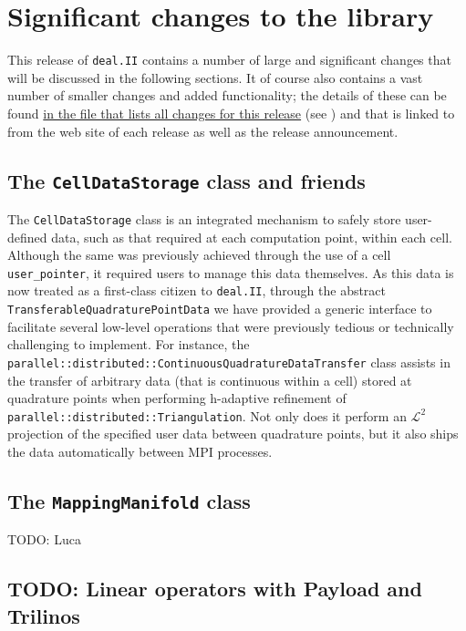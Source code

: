 \documentclass{ansarticle-preprint}
\newcommand{\specialword}[1]{\texttt{#1}}
\newcommand{\dealii}{{\specialword{deal.II}}}
\begin{document}
\section{Significant changes to the library}

This release of \dealii{} contains a number of large and significant changes
that will be discussed in the following sections. It of course also contains a
vast number of smaller changes and added functionality; the details of these
can be found
\href{https://www.dealii.org/8.5.0/doxygen/deal.II/changes_between_8_4_and_8_5.html}{in the file that lists all changes for this release} (see \cite{changes84})
and that is linked to from the web site of each release as well as the
release announcement.


\subsection{The \texttt{CellDataStorage} class and friends}

The \texttt{CellDataStorage} class is an integrated mechanism to safely store user-defined data, such as that required at each computation point, within each cell.
Although the same was previously achieved through the use of a cell \texttt{user\_pointer}, it required users to manage this data themselves.
As this data is now treated as a first-class citizen to \dealii{}, through the abstract \texttt{TransferableQuadraturePointData} we have provided a generic interface to facilitate several low-level operations that were previously tedious or technically challenging to implement.
For instance, the \texttt{parallel::distributed::ContinuousQuadratureDataTransfer} class assists in the transfer of arbitrary data (that is continuous within a cell) stored at quadrature points when performing h-adaptive refinement of \texttt{parallel::distributed::Triangulation}.
Not only does it perform an $\mathcal{L}^2$ projection of the specified user data between quadrature points, but it also ships the data automatically between MPI processes.

\subsection{The \texttt{MappingManifold} class}

TODO: Luca

\subsection{TODO: Linear operators with Payload and Trilinos}
\end{document}
